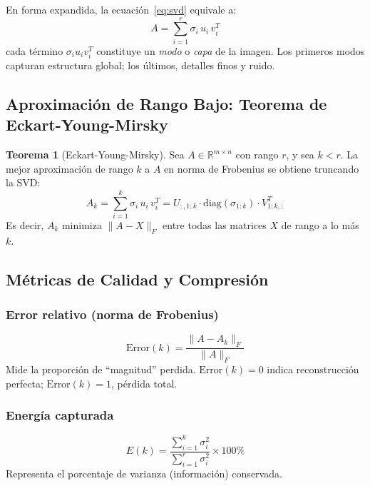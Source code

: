 ﻿\documentclass[12pt,a4paper]{article}
\theoremstyle{definition}
\newtheorem{theorem}{Teorema}[section]
\newcommand{\normF}[1]{\|#1\|_F}
\newcommand{\R}{\mathbb{R}}
\begin{document}
En forma expandida, la ecuaci\'{o}n~\eqref{eq:svd} equivale a:
\begin{equation}\label{eq:svd-exp}
A = \sum_{i=1}^{r} \sigma_i \, u_i \, v_i^T
\end{equation}
cada t\'{e}rmino $\sigma_i u_i v_i^T$ constituye un \emph{modo} o \emph{capa} de la imagen. Los primeros modos capturan estructura global; los \'{u}ltimos, detalles finos y ruido.

\subsection{Aproximaci\'{o}n de Rango Bajo: Teorema de Eckart-Young-Mirsky}

\begin{theorem}[Eckart-Young-Mirsky]\label{thm:eym}
Sea $A \in \R^{m \times n}$ con rango $r$, y sea $k < r$. La mejor aproximaci\'{o}n de rango $k$ a $A$ en norma de Frobenius se obtiene truncando la SVD:
\begin{equation}\label{eq:rank-k}
A_k = \sum_{i=1}^{k} \sigma_i \, u_i \, v_i^T = U_{:,1:k} \cdot \text{diag}(\sigma_{1:k}) \cdot V^T_{1:k,:}
\end{equation}
Es decir, $A_k$ minimiza $\normF{A - X}$ entre todas las matrices $X$ de rango a lo m\'{a}s $k$.
\end{theorem}

\subsection{M\'{e}tricas de Calidad y Compresi\'{o}n}\label{sec:metricas}

\subsubsection{Error relativo (norma de Frobenius)}
\begin{equation}\label{eq:error}
\text{Error}(k) = \frac{\normF{A - A_k}}{\normF{A}}
\end{equation}
Mide la proporci\'{o}n de ``magnitud'' perdida. $\text{Error}(k) = 0$ indica reconstrucci\'{o}n perfecta; $\text{Error}(k) = 1$, p\'{e}rdida total.

\subsubsection{Energ\'{i}a capturada}
\begin{equation}\label{eq:energia}
E(k) = \frac{\sum_{i=1}^{k} \sigma_i^2}{\sum_{i=1}^{r} \sigma_i^2} \times 100\%
\end{equation}
Representa el porcentaje de varianza (informaci\'{o}n) conservada.
\end{document}
